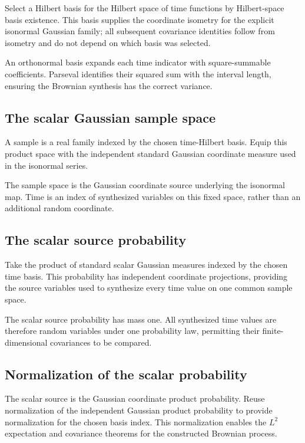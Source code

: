 \documentclass[11pt,a4paper]{article}
\begin{document}
Select a Hilbert basis for the Hilbert space of time functions by Hilbert-space basis existence. This basis supplies the coordinate isometry for the explicit isonormal Gaussian family; all subsequent covariance identities follow from isometry and do not depend on which basis was selected.



An orthonormal basis expands each time indicator with square-summable coefficients. Parseval identifies their squared sum with the interval length, ensuring the Brownian synthesis has the correct variance.


\subsection{\texorpdfstring{The scalar Gaussian sample space}{The scalar Gaussian sample space}}


A sample is a real family indexed by the chosen time-Hilbert basis. Equip this product space with the independent standard Gaussian coordinate measure used in the isonormal series.



The sample space is the Gaussian coordinate source underlying the isonormal map. Time is an index of synthesized variables on this fixed space, rather than an additional random coordinate.


\subsection{\texorpdfstring{The scalar source probability}{The scalar source probability}}


Take the product of standard scalar Gaussian measures indexed by the chosen time basis. This probability has independent coordinate projections, providing the source variables used to synthesize every time value on one common sample space.



The scalar source probability has mass one. All synthesized time values are therefore random variables under one probability law, permitting their finite-dimensional covariances to be compared.


\subsection{\texorpdfstring{Normalization of the scalar probability}{Normalization of the scalar probability}}


The scalar source is the Gaussian coordinate product probability. Reuse normalization of the independent Gaussian product probability to provide normalization for the chosen basis index. This normalization enables the \(L^2\) expectation and covariance theorems for the constructed Brownian process.
\end{document}
